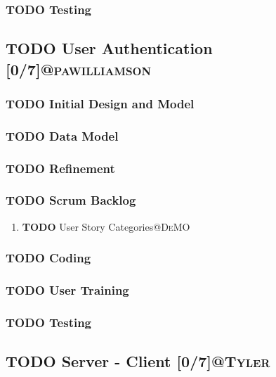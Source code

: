 \documentclass[11pt]{article}
\begin{document}
\subsubsection{{\bfseries\sffamily TODO} Testing}
\label{sec:org59b48d4}
\subsection{{\bfseries\sffamily TODO} User Authentication [0/7]\hfill{}\textsc{@pawilliamson}}
\label{sec:orgd00cec4}
\subsubsection{{\bfseries\sffamily TODO} Initial Design and Model}
\label{sec:org5596d34}
\subsubsection{{\bfseries\sffamily TODO} Data Model}
\label{sec:orgefcd13c}
\subsubsection{{\bfseries\sffamily TODO} Refinement}
\label{sec:org759e7f9}
\subsubsection{{\bfseries\sffamily TODO} Scrum Backlog}
\label{sec:orge2b0cea}
\begin{enumerate}
\item {\bfseries\sffamily TODO} User Story Categories\hfill{}\textsc{@DeMO}
\label{sec:orgbb7683d}
\end{enumerate}
\subsubsection{{\bfseries\sffamily TODO} Coding}
\label{sec:org2d0e6a3}
\subsubsection{{\bfseries\sffamily TODO} User Training}
\label{sec:orgfa30323}
\subsubsection{{\bfseries\sffamily TODO} Testing}
\label{sec:orgfc01316}
\subsection{{\bfseries\sffamily TODO} Server - Client [0/7]\hfill{}\textsc{@Tyler}}
\label{sec:org3b8ab40}
\end{document}
